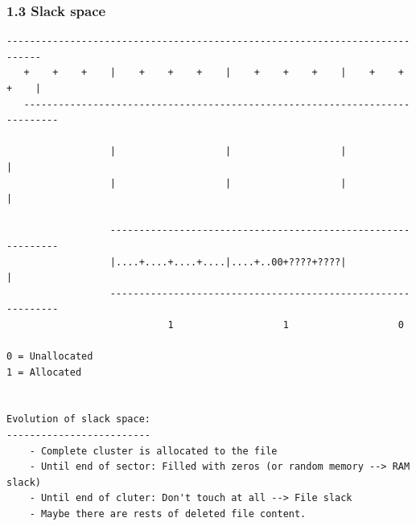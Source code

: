 \begin{frame}[fragile]
  \frametitle{1.3 Slack space}
  \begin{lstlisting}[basicstyle=\tiny\ttfamily]
   ----------------------------------------------------------------------------
   +    +    +    |    +    +    +    |    +    +    +    |    +    +    +    |
   ----------------------------------------------------------------------------

                  |                   |                   |                   |
                  |                   |                   |                   |

                  -------------------------------------------------------------
                  |....+....+....+....|....+..00+????+????|                   |
                  -------------------------------------------------------------
                            1                   1                   0 

0 = Unallocated
1 = Allocated


Evolution of slack space:
-------------------------
	- Complete cluster is allocated to the file
	- Until end of sector: Filled with zeros (or random memory --> RAM slack)
	- Until end of cluter: Don't touch at all --> File slack
	- Maybe there are rests of deleted file content.
  \end{lstlisting}
\end{frame}


